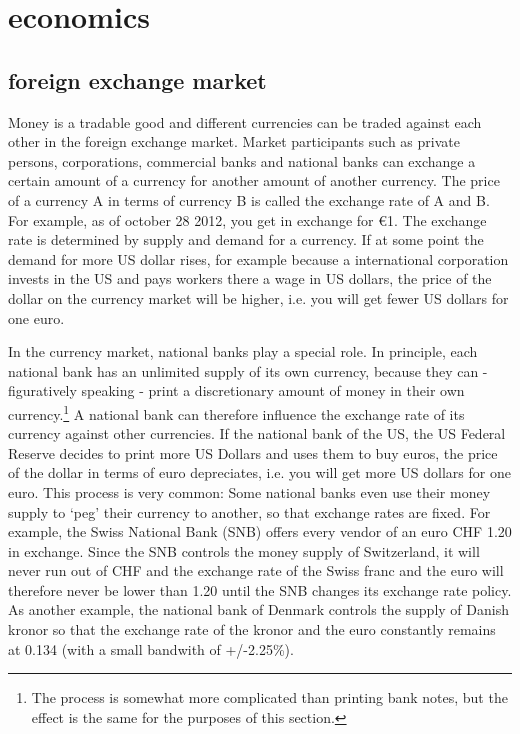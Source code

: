 \documentclass[11pt]{article}
\begin{document}
\section{economics}


\subsection{foreign exchange market}

Money is a tradable good and different currencies can be traded against each other in the foreign exchange market. Market participants such as private persons, corporations, commercial banks and national banks can exchange a certain amount of a currency for another amount of another currency. The price of a currency A in terms of currency B is called the exchange rate of A and B. For example, as of october 28 2012, you get  in exchange for \euro{1}. The exchange rate is determined by supply and demand for a currency. If at some point the demand for more US dollar rises, for example because a international corporation invests in the US and pays workers there a wage in US dollars, the price of the dollar on the currency market will be higher, i.e. you will get fewer US dollars for one euro.

In the currency market, national banks play a special role. In principle, each national bank has an unlimited supply of its own currency, because they can - figuratively speaking - print a discretionary amount of money in their own currency.\footnote{The process is somewhat more complicated than printing bank notes, but the effect is the same for the purposes of this section.} A national bank can therefore influence the exchange rate of its currency against other currencies. If the national bank of the US, the US Federal Reserve decides to print more US Dollars and uses them to buy euros, the price of the dollar in terms of euro depreciates, i.e. you will get more US dollars for one euro. This process is very common: Some national banks even use their money supply to `peg' their currency to another, so that exchange rates are fixed. For example, the Swiss National Bank (SNB) offers every vendor of an euro CHF 1.20 in exchange. Since the SNB controls the money supply of Switzerland, it will never run out of CHF and the exchange rate of the Swiss franc and the euro will therefore never be lower than 1.20 until the SNB changes its exchange rate policy. As another example, the national bank of Denmark controls the supply of Danish kronor so that the exchange rate of the kronor and the euro constantly remains at 0.134 (with a small bandwith of +/-2.25\%). 
\end{document}
